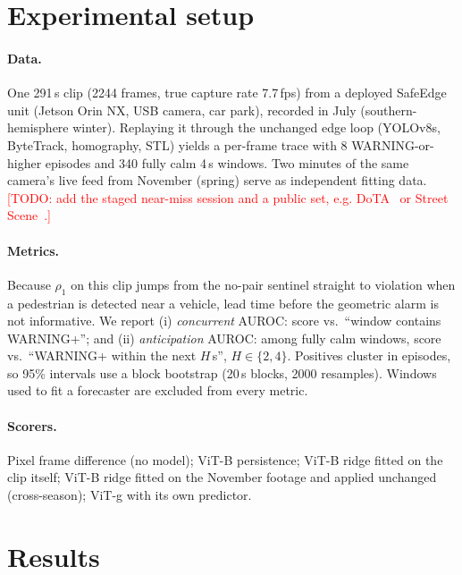 \documentclass[11pt]{article}
\newcommand{\todo}[1]{\textcolor{red}{[TODO: #1]}}
\begin{document}
\section{Experimental setup}
\label{sec:setup}

\paragraph{Data.} One 291\,s clip (2244 frames, true capture rate 7.7\,fps)
from a deployed SafeEdge unit (Jetson Orin NX, USB camera, car park), recorded
in July (southern-hemisphere winter). Replaying it through the unchanged edge
loop (YOLOv8s, ByteTrack, homography, STL) yields a per-frame trace with
8 WARNING-or-higher episodes and 340 fully calm 4\,s windows. Two minutes of
the same camera's live feed from November (spring) serve as independent fitting
data. \todo{add the staged near-miss session and a public set, e.g. DoTA~\citep{yao2022dota}
or Street Scene~\citep{ramachandra2020streetscene}.}

\paragraph{Metrics.} Because $\rho_1$ on this clip jumps from the no-pair
sentinel straight to violation when a pedestrian is detected near a vehicle,
lead time before the geometric alarm is not informative. We report
(i) \emph{concurrent} AUROC: score vs.\ ``window contains WARNING+''; and
(ii) \emph{anticipation} AUROC: among fully calm windows, score vs.\
``WARNING+ within the next $H$\,s'', $H \in \{2, 4\}$. Positives cluster in
episodes, so 95\% intervals use a block bootstrap (20\,s blocks, 2000
resamples). Windows used to fit a forecaster are excluded from every metric.

\paragraph{Scorers.} Pixel frame difference (no model); ViT-B persistence;
ViT-B ridge fitted on the clip itself; ViT-B ridge fitted on the November
footage and applied unchanged (cross-season); ViT-g with its own predictor.

\section{Results}
\label{sec:results}
\end{document}
